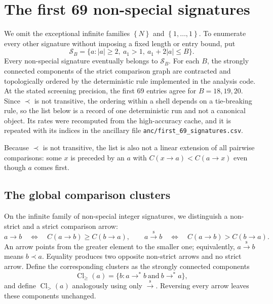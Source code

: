 \documentclass[11pt]{article}
\theoremstyle{definition}
\theoremstyle{remark}
\newcommand{\sig}[1]{\left\{#1\right\}}
\begin{document}
\section{The first 69 non-special signatures}

We omit the exceptional infinite families \(\sig{N}\) and
\(\sig{1,\ldots,1}\).  To enumerate every other signature without imposing a
fixed length or entry bound, put
\[
  \mathcal S_B
  =\{a:|a|\geq2,\ a_1>1,\ a_1+2|a|\leq B\}.
\]
Every non-special signature eventually belongs to \(\mathcal S_B\).  For each
\(B\), the strongly connected components of the strict comparison graph are
contracted and topologically ordered by the deterministic rule implemented in
the analysis code.  At the stated screening precision, the first 69 entries
agree for \(B=18,19,20\).  Since \(\prec\) is not transitive, the ordering
within a shell depends on a tie-breaking rule, so the list below is a record
of one deterministic run and not a canonical object.  Its rates were
recomputed from the high-accuracy cache, and it is repeated with its indices
in the ancillary file \texttt{anc/first\_69\_signatures.csv}.

Because \(\prec\) is not transitive, the list is also not a linear extension
of all pairwise comparisons: some \(x\) is preceded by an \(a\) with
\(C(x\to a)<C(a\to x)\) even though \(a\) comes first.



\subsection{The global comparison clusters}

On the infinite family of non-special integer signatures, we distinguish a
non-strict and a strict comparison arrow:
\[
  a\longrightarrow b
  \quad\Longleftrightarrow\quad
  C(a\to b)\geq C(b\to a),
  \qquad
  a\overset{\mathrm{s}}{\longrightarrow}b
  \quad\Longleftrightarrow\quad
  C(a\to b)>C(b\to a).
\]
An arrow points from the greater element to the smaller one; equivalently,
\(a\overset{\mathrm{s}}{\longrightarrow}b\) means \(b\prec a\).
Equality produces two opposite non-strict arrows and no strict arrow.  Define
the corresponding clusters as the strongly connected components
\[
  \operatorname{Cl}_{\geq}(a)
  =\{b:a\longrightarrow^{*}b
          \ \text{and}\ b\longrightarrow^{*}a\},
\]
and define \(\operatorname{Cl}_{>}(a)\) analogously using only
\(\overset{\mathrm{s}}{\longrightarrow}\).  Reversing every arrow leaves
these components unchanged.
\end{document}
